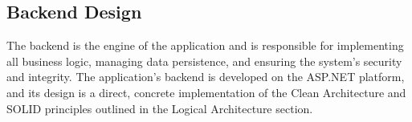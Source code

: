 \subsection{Backend Design}
\label{sec:backend_design}

The backend is the engine of the application and is responsible for implementing all business logic, managing data persistence, and ensuring the system's security and integrity. The application's backend is developed on the ASP.NET platform, and its design is a direct, concrete implementation of the Clean Architecture and SOLID principles outlined in the Logical Architecture section.
 
 



